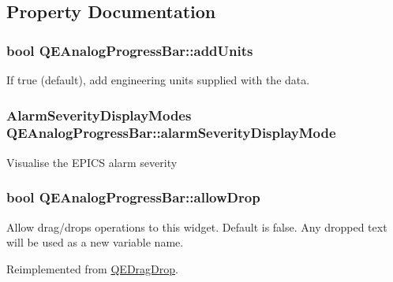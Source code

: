 \subsection{Property Documentation}
\hypertarget{classQEAnalogProgressBar_acf2eceefd48561bd1c71dade146b83e8}{
\subsubsection[{addUnits}]{\setlength{\rightskip}{0pt plus 5cm}bool QEAnalogProgressBar::addUnits}}
\label{classQEAnalogProgressBar_acf2eceefd48561bd1c71dade146b83e8}
If true (default), add engineering units supplied with the data. \hypertarget{classQEAnalogProgressBar_a56a25b5a3d02ee737837b8e4bc15cd8f}{
\subsubsection[{alarmSeverityDisplayMode}]{\setlength{\rightskip}{0pt plus 5cm}AlarmSeverityDisplayModes QEAnalogProgressBar::alarmSeverityDisplayMode}}
\label{classQEAnalogProgressBar_a56a25b5a3d02ee737837b8e4bc15cd8f}
Visualise the EPICS alarm severity \hypertarget{classQEAnalogProgressBar_a647882bfa81bbde45d2c2be4b1d691d6}{
\subsubsection[{allowDrop}]{\setlength{\rightskip}{0pt plus 5cm}bool QEAnalogProgressBar::allowDrop}}
\label{classQEAnalogProgressBar_a647882bfa81bbde45d2c2be4b1d691d6}
Allow drag/drops operations to this widget. Default is false. Any dropped text will be used as a new variable name. 

Reimplemented from \hyperlink{classQEDragDrop}{QEDragDrop}.

